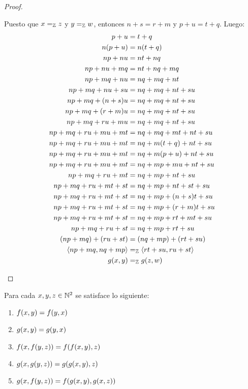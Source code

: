 \begin{proof}
\begin{enumerate}
		Puesto que $x =_{\mathbb{Z}} z$ y $y =_{\mathbb{Z}} w$, entonces $n + s = r + m$ y $p + u = t + q$. Luego:
		\begin{align*}
			p + u &= t + q\\
			n\pa*{p + u} &= n\pa*{t + q}\\
			np + nu &= nt + nq\\
			np + nu + mq &= nt + nq + mq\\
			np + mq + nu &= nq + mq + nt\\
			np + mq + nu + su &= nq + mq + nt + su\\
			np + mq +\pa*{n + s}u &= nq + mq + nt + su\\
			np + mq +\pa*{r + m}u &= nq + mq + nt + su\\
			np + mq + ru + mu &= nq + mq + nt + su\\
			np + mq + ru + mu + mt &= nq + mq + mt + nt + su\\
			np + mq + ru + mu + mt &= nq + m\pa*{t + q} + nt + su\\
			np + mq + ru + mu + mt &= nq + m\pa*{p + u} + nt + su\\
			np + mq + ru + mu + mt &= nq + mp + mu + nt + su\\
			np + mq + ru + mt &= nq + mp + nt + su\\
			np + mq + ru + mt + st &= nq + mp + nt + st + su\\
			np + mq + ru + mt + st &= nq + mp +\pa*{n + s}t + su\\
			np + mq + ru + mt + st &= nq + mp +\pa*{r + m}t + su\\
			np + mq + ru + mt + st &= nq + mp + rt + mt + su\\
			np + mq + ru + st &= nq + mp + rt + su\\
			\pa*{np + mq} +\pa*{ru + st} &=\pa*{nq + mp} +\pa*{rt + su}\\
			\inner*{np + mq, nq + mp} &=_{\ZZ}\inner*{rt + su, ru + st}\\
			g\pa*{x, y} &=_{\ZZ} g\pa*{z, w}
		\end{align*}
	\end{enumerate}
\end{proof}

\begin{lemma}
	\label{lemma: prop_suma_prod_z}
	Para cada $x, y, z\in\mathbb{N}^{2}$ se satisface lo siguiente:

	\begin{enumerate}
		\item $f\pa*{x, y} = f\pa*{y, x}$
		\item $g\pa*{x, y} = g\pa*{y, x}$
		\item $f\pa*{x, f\pa*{y, z}} = f\pa*{f\pa*{x, y}, z}$
		\item $g\pa*{x, g\pa*{y, z}} = g\pa*{g\pa*{x, y}, z}$
		\item $g\pa*{x, f\pa*{y, z}} = f\pa*{g\pa*{x, y}, g\pa*{x, z}}$
	\end{enumerate}
\end{lemma}

